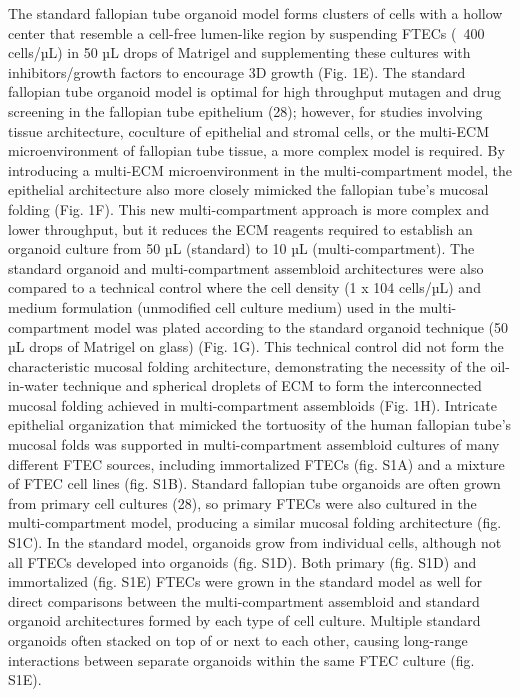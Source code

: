 \begin{refsection}
    The standard fallopian tube organoid model forms clusters of cells with a hollow center that resemble a cell-free lumen-like region\cite{kessler2015a,xie2018a} by suspending FTECs (~400 cells/µL) in 50 µL drops of Matrigel and supplementing these cultures with inhibitors/growth factors to encourage 3D growth (Fig. 1E). The standard fallopian tube organoid model is optimal for high throughput mutagen and drug screening in the fallopian tube epithelium (28); however, for studies involving tissue architecture, coculture of epithelial and stromal cells, or the multi-ECM microenvironment of fallopian tube tissue\cite{wheeler1982a,popescu2005a}, a more complex model is required. By introducing a multi-ECM microenvironment in the multi-compartment model, the epithelial architecture also more closely mimicked the fallopian tube’s mucosal folding (Fig. 1F). This new multi-compartment approach is more complex and lower throughput, but it reduces the ECM reagents required to establish an organoid culture from 50 µL (standard) to 10 µL (multi-compartment). The standard organoid and multi-compartment assembloid architectures were also compared to a technical control where the cell density (1 x 104 cells/µL) and medium formulation (unmodified cell culture medium) used in the multi-compartment model was plated according to the standard organoid technique (50 µL drops of Matrigel on glass) (Fig. 1G). This technical control did not form the characteristic mucosal folding architecture, demonstrating the necessity of the oil-in-water technique and spherical droplets of ECM to form the interconnected mucosal folding achieved in multi-compartment assembloids (Fig. 1H).
    Intricate epithelial organization that mimicked the tortuosity of the human fallopian tube’s mucosal folds was supported in multi-compartment assembloid cultures of many different FTEC sources, including immortalized FTECs (fig. S1A) and a mixture of FTEC cell lines (fig. S1B). Standard fallopian tube organoids are often grown from primary cell cultures (28), so primary FTECs were also cultured in the multi-compartment model, producing a similar mucosal folding architecture (fig. S1C). In the standard model, organoids grow from individual cells\cite{kessler2015a}, although not all FTECs developed into organoids (fig. S1D). Both primary (fig. S1D) and immortalized (fig. S1E) FTECs were grown in the standard model as well for direct comparisons between the multi-compartment assembloid and standard organoid architectures formed by each type of cell culture. Multiple standard organoids often stacked on top of or next to each other, causing long-range interactions between separate organoids within the same FTEC culture (fig. S1E). 

\end{refsection}
